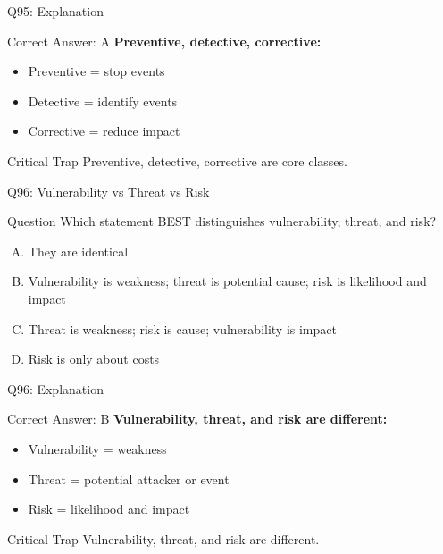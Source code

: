 \documentclass{beamer}
\begin{document}
	\begin{frame}{Q95: Explanation}
		\begin{block}{Correct Answer: A}
			\textbf{Preventive, detective, corrective:}
			\begin{itemize}
				\item Preventive = stop events
				\item Detective = identify events
				\item Corrective = reduce impact
			\end{itemize}
		\end{block}
		\begin{alertblock}{Critical Trap}
			Preventive, detective, corrective are core classes.
		\end{alertblock}
	\end{frame}
	
	\begin{frame}{Q96: Vulnerability vs Threat vs Risk}
		\begin{block}{Question}
			Which statement BEST distinguishes vulnerability, threat, and risk?
		\end{block}
		\begin{enumerate}[(A)]
			\item They are identical
			\item Vulnerability is weakness; threat is potential cause; risk is likelihood and impact
			\item Threat is weakness; risk is cause; vulnerability is impact
			\item Risk is only about costs
		\end{enumerate}
	\end{frame}
	
	\begin{frame}{Q96: Explanation}
		\begin{block}{Correct Answer: B}
			\textbf{Vulnerability, threat, and risk are different:}
			\begin{itemize}
				\item Vulnerability = weakness
				\item Threat = potential attacker or event
				\item Risk = likelihood and impact
			\end{itemize}
		\end{block}
		\begin{alertblock}{Critical Trap}
			Vulnerability, threat, and risk are different.
		\end{alertblock}
	\end{frame}
	
\end{document}
